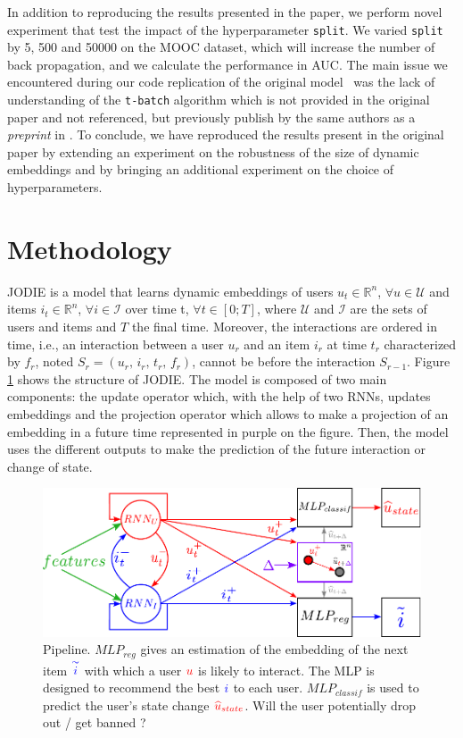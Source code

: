 In addition to reproducing the results presented in the paper, we perform novel experiment that test the impact of the hyperparameter \texttt{split}. We varied \texttt{split} by 5, 500 and 50000 on the MOOC dataset, which will increase the number of back propagation, and we calculate the performance in AUC. The main issue we encountered during our code replication of the original model~\cite{kumar2019predicting} was the lack of understanding of the \texttt{t-batch} algorithm which is not provided in the original paper and not referenced, but previously publish by the same authors as a \textit{preprint} in \cite{kumar18}.
To conclude, we have reproduced the results present in the original paper by extending an experiment on the robustness of the size of dynamic embeddings and by bringing an additional experiment on the choice of hyperparameters.

\section*{Methodology}
JODIE is a model that learns dynamic embeddings of users $u_t \in \mathbb{R}^n$, $\forall u \in \mathcal{U}$ and items $i_t \in \mathbb{R}^n$, $\forall i \in \mathcal{I}$ over time t, $\forall t \in [0; T]$, where $\mathcal{U}$ and $\mathcal{I}$ are the sets of users and items and $T$ the final time. Moreover, the interactions are ordered in time, i.e., an interaction between a user $u_r$ and an item $i_r$ at time $t_r$ characterized by $f_r$, noted $S_r = (u_r, \, i_r, \, t_r, \, f_r)$, cannot be before the interaction $S_{r-1}$. Figure \ref{Pipeline} shows the structure of JODIE. The model is composed of two main components: the update operator which, with the help of two RNNs, updates embeddings and the projection operator which allows to make a projection of an embedding in a future time represented in purple on the figure. Then, the model uses the different outputs to make the prediction of the future interaction or change of state.


\begin{figure}[htbp]
    \begin{center}
        \includegraphics[width=1.0\textwidth]{image/pipeline.pdf}
    \end{center}
    \caption{Pipeline. $MLP_{reg}$ gives an estimation of the embedding of the next item $\textcolor{blue}{\overset{\sim}{i}}$ with which a user $\textcolor{red}{u}$ is likely to interact. The MLP  is designed to recommend the best $\textcolor{blue}{i}$ to each user. $MLP_{classif}$ is used to predict the user's state change $\textcolor{red}{\widehat u_{state}}$. Will the user potentially drop out / get banned ?}
    \label{Pipeline}
\end{figure}


